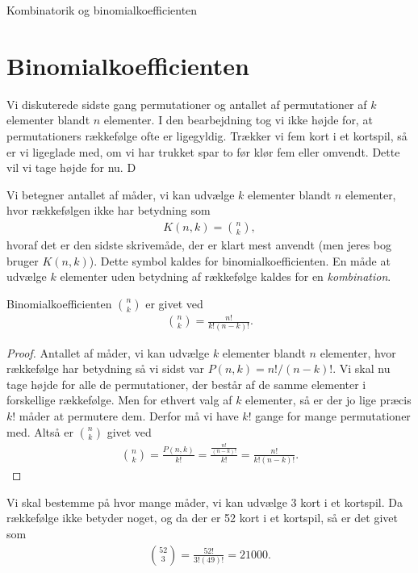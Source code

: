 \begin{center}
\Huge
Kombinatorik og binomialkoefficienten
\end{center}

\section*{Binomialkoefficienten}
Vi diskuterede sidste gang permutationer og antallet af permutationer af $k$ elementer blandt $n$ elementer. I den bearbejdning tog vi ikke højde for, at permutationers rækkefølge ofte er ligegyldig. Trækker vi fem kort i et kortspil, så er vi ligeglade med, om vi har trukket spar to før klør fem eller omvendt. Dette vil vi tage højde for nu. D

\begin{defn}
Vi betegner antallet af måder, vi kan udvælge $k$ elementer blandt $n$ elementer, hvor rækkefølgen ikke har betydning som
\begin{align*}
K(n,k) = \binom{n}{k},
\end{align*}
hvoraf det er den sidste skrivemåde, der er klart mest anvendt (men jeres bog bruger $K(n,k)$). Dette symbol kaldes for binomialkoefficienten. En måde at udvælge $k$ elementer uden betydning af rækkefølge kaldes for en \textit{kombination}.
\end{defn}
\begin{setn}
Binomialkoefficienten $\binom{n}{k}$ er givet ved
\begin{align*}
\binom{n}{k} = \frac{n!}{k!(n-k)!}.
\end{align*}
\end{setn}
\begin{proof}
Antallet af måder, vi kan udvælge $k$ elementer blandt $n$ elementer, hvor rækkefølge har betydning så vi sidst var $P(n,k) = n!/(n-k)!$. Vi skal nu tage højde for alle de permutationer, der består af de samme elementer i forskellige rækkefølge. Men for ethvert valg af $k$ elementer, så er der jo lige præcis $k!$ måder at permutere dem. Derfor må vi have $k!$ gange for mange permutationer med. Altså er $\binom{n}{k}$ givet ved
\begin{align*}
 \binom{n}{k} = \frac{P(n,k)}{k!} = \frac{\frac{n!}{(n-k)!}}{k!} = \frac{n!}{k!(n-k)!}.
\end{align*}
\end{proof}

\begin{exa}
Vi skal bestemme på hvor mange måder, vi kan udvælge 3 kort i et kortspil. Da rækkefølge ikke betyder noget, og da der er 52 kort i et kortspil, så er det givet som
\begin{align*}
\binom{52}{3} = \frac{52!}{3!(49)!} = 21000.
\end{align*}
\end{exa}

